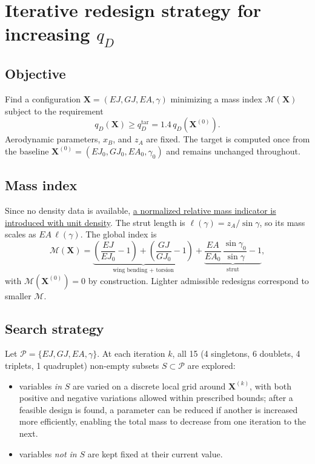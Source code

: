\renewcommand{\parttitle}{Iterative redesign strategy for increasing $q_D$}
\section*{\parttitle}


\subsection*{Objective} Find a configuration $\mathbf{X}=(EJ,GJ,EA,\gamma)$ minimizing a mass index $\mathcal{M}(\mathbf{X})$ subject to the requirement
\[
q_D(\mathbf{X})\ge q_D^{\mathrm{tar}}=1.4\,q_D(\mathbf{X}^{(0)}).
\]
Aerodynamic parameters, $x_B$, and $z_A$ are fixed. The target is computed once from the baseline $\mathbf{X}^{(0)}=(EJ_0,GJ_0,EA_0,\gamma_0)$ and remains unchanged throughout.

\subsection*{Mass index} Since no density data is available, \underline{a normalized relative mass indicator is introduced with unit density}. The strut length is $\ell(\gamma)=z_A/\sin\gamma$, so its mass scales as $EA\,\ell(\gamma)$. The global index is
\[
\mathcal{M}(\mathbf{X})
=
\underbrace{\left(\frac{EJ}{EJ_0}-1\right)+\left(\frac{GJ}{GJ_0}-1\right)}_{\text{wing bending + torsion}}
+
\underbrace{\frac{EA}{EA_0}\,\frac{\sin\gamma_0}{\sin\gamma}-1}_{\text{strut}},
\]
with $\mathcal{M}(\mathbf{X}^{(0)})=0$ by construction. Lighter admissible redesigns correspond to smaller $\mathcal{M}$.

\subsection*{Search strategy} Let $\mathcal{P}=\{EJ,GJ,EA,\gamma\}$. At each iteration $k$, all 15 (4 singletons, 6 doublets, 4 triplets, 1 quadruplet) non-empty subsets $S\subset\mathcal{P}$ are explored:
\begin{itemize}\itemsep=0pt
    \item variables \emph{in} $S$ are varied on a discrete local grid around $\mathbf{X}^{(k)}$, with both positive and negative variations allowed within prescribed bounds; after a feasible design is found, a parameter can be reduced if another is increased more efficiently, enabling the total mass to decrease from one iteration to the next.

    \item variables \emph{not in} $S$ are kept fixed at their current value.
\end{itemize}

